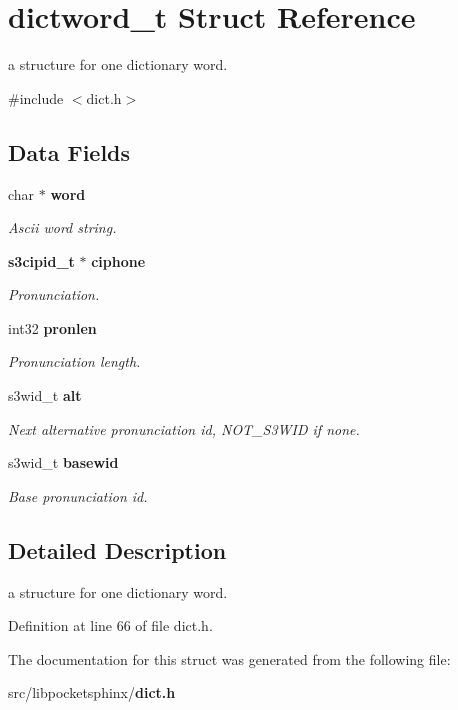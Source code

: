 \section{dictword\-\_\-t Struct Reference}
\label{structdictword__t}


a structure for one dictionary word.  




{\ttfamily \#include $<$dict.\-h$>$}

\subsection*{Data Fields}
\begin{DoxyCompactItemize}
\item 
char $\ast$ {\bf word}\label{structdictword__t_a3f3371918a406e26817bd4f2cecd7329}

\begin{DoxyCompactList}\small\item\em Ascii word string. \end{DoxyCompactList}\item 
{\bf s3cipid\-\_\-t} $\ast$ {\bf ciphone}\label{structdictword__t_acf5836b5a681485868e9090ad67366d5}

\begin{DoxyCompactList}\small\item\em Pronunciation. \end{DoxyCompactList}\item 
int32 {\bf pronlen}\label{structdictword__t_a50509f28a4b64d76519bfadea12f0fa0}

\begin{DoxyCompactList}\small\item\em Pronunciation length. \end{DoxyCompactList}\item 
s3wid\-\_\-t {\bf alt}\label{structdictword__t_a84b63cd03706221645f46b2da09e9540}

\begin{DoxyCompactList}\small\item\em Next alternative pronunciation id, N\-O\-T\-\_\-\-S3\-W\-I\-D if none. \end{DoxyCompactList}\item 
s3wid\-\_\-t {\bf basewid}\label{structdictword__t_a53dd72f96a9de21d8925e246cc7c036f}

\begin{DoxyCompactList}\small\item\em Base pronunciation id. \end{DoxyCompactList}\end{DoxyCompactItemize}


\subsection{Detailed Description}
a structure for one dictionary word. 

Definition at line 66 of file dict.\-h.



The documentation for this struct was generated from the following file\-:\begin{DoxyCompactItemize}
\item 
src/libpocketsphinx/{\bf dict.\-h}\end{DoxyCompactItemize}
